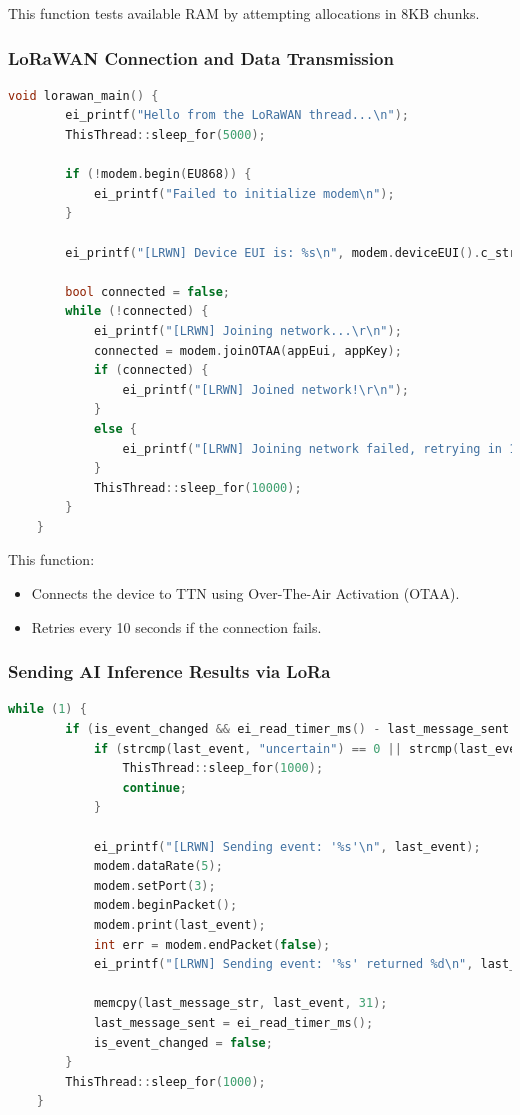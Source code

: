 This function tests available RAM by attempting allocations in 8KB chunks.

\subsubsection{LoRaWAN Connection and Data Transmission}

\begin{lstlisting}[language=C++, caption=LoRaWAN Connection]
	void lorawan_main() {
		ei_printf("Hello from the LoRaWAN thread...\n");
		ThisThread::sleep_for(5000);
		
		if (!modem.begin(EU868)) {
			ei_printf("Failed to initialize modem\n");
		}
		
		ei_printf("[LRWN] Device EUI is: %s\n", modem.deviceEUI().c_str());
		
		bool connected = false;
		while (!connected) {
			ei_printf("[LRWN] Joining network...\r\n");
			connected = modem.joinOTAA(appEui, appKey);
			if (connected) {
				ei_printf("[LRWN] Joined network!\r\n");
			}
			else {
				ei_printf("[LRWN] Joining network failed, retrying in 10 seconds...\r\n");
			}
			ThisThread::sleep_for(10000);
		}
	}
\end{lstlisting}

This function:
\begin{itemize}
	\item Connects the device to TTN using Over-The-Air Activation (OTAA).
	\item Retries every 10 seconds if the connection fails.
\end{itemize}

\subsubsection{Sending AI Inference Results via LoRa}

\begin{lstlisting}[language=C++, caption=Sending AI Events via LoRa]
	while (1) {
		if (is_event_changed && ei_read_timer_ms() - last_message_sent >= 7000) {
			if (strcmp(last_event, "uncertain") == 0 || strcmp(last_event, last_message_str) == 0) {
				ThisThread::sleep_for(1000);
				continue;
			}
			
			ei_printf("[LRWN] Sending event: '%s'\n", last_event);
			modem.dataRate(5);
			modem.setPort(3);
			modem.beginPacket();
			modem.print(last_event);
			int err = modem.endPacket(false);
			ei_printf("[LRWN] Sending event: '%s' returned %d\n", last_event, err);
			
			memcpy(last_message_str, last_event, 31);
			last_message_sent = ei_read_timer_ms();
			is_event_changed = false;
		}
		ThisThread::sleep_for(1000);
	}
\end{lstlisting}

